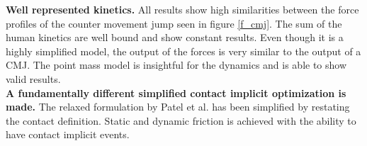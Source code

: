 \documentclass[default,iicol]{sn-jnl}
\begin{document}
{%



\noindent\textbf{Well represented kinetics.} All results show high similarities between the force profiles of the counter movement jump seen in figure \ref{f_cmj}. The sum of the human kinetics are well bound and show constant results. Even though it is a highly simplified model, the output of the forces is very similar to the output of a CMJ. The point mass model is insightful for the dynamics and is able to show valid results. \\

\noindent\textbf{A fundamentally different simplified contact implicit optimization is made.} The relaxed formulation by Patel et al. \cite{patel_contact-implicit_2019} has been simplified by restating the contact definition. Static and dynamic friction is achieved with the ability to have contact implicit events.

}
\end{document}
